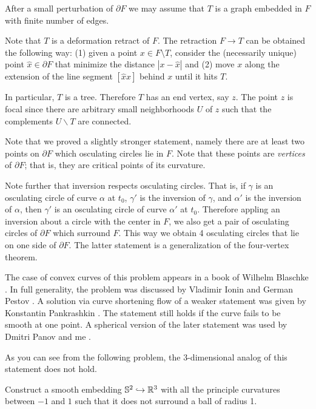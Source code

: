 \medskip

After a small perturbation
of $\partial F$ we may assume that
$T$ is a graph embedded in
$F$ with finite number of edges.

Note that $T$ is a
deformation retract of $F$.
The retraction $F\to T$ can be obtained the following way:
(1) given a point $x\in F\setminus T$,
consider the (necessarily unique) point $\hat x\in \partial F$ that minimize the distance $|x-\hat x|$ and
(2) move $x$ along the extension of the line segment $[\hat x x]$ behind $x$ until it hits $T$.

In particular, $T$ is a tree.
Therefore $T$ has
an end vertex, say $z$.
The point $z$ is focal since there are arbitrary small neighborhoods $U$ of $z$ such that the complements $U\backslash T$ are connected.
\qeds

Note that we proved a slightly stronger statement, namely there are at least two points on $\partial F$ which osculating circles lie in $F$.
Note that these points are \emph{vertices} of $\partial F$;
that is, they are critical points of its curvature.

Note further that inversion respects osculating circles.
That is, if $\gamma$ is an osculating circle of curve $\alpha$ at $t_0$,
$\gamma'$ is the inversion of $\gamma$, and 
$\alpha'$ is the inversion of $\alpha$,
then $\gamma'$ is an osculating circle of curve $\alpha'$ at $t_0$.
Therefore appling an inversion about a circle with the center in $F$, we also get a pair of osculating circles of $\partial F$ which surround $F$.
This way we obtain 4 osculating circles that lie on one side of $\partial F$.
The latter statement is a generalization of the four-vertex theorem.

The case of convex curves of this problem appears in a book of Wilhelm Blaschke \cite[see \S 24 in][]{blaschke}.
In full generality, the problem was discussed by Vladimir Ionin and German Pestov \cite{pestov-ionin}. %
A solution via curve shortening flow of a weaker statement 
was given by Konstantin Pankrashkin \cite{pankrashkin}.
The statement still holds if the curve fails to be smooth at one point.
A spherical version of the later statement 
was used by Dmitri Panov and me \cite{panov-petrunin-ramification}.

As you can see from the following problem, the 3-dimensional analog of this statement does not hold.

\begin{pr}
Construct a smooth embedding $\mathbb{S}^2\hookrightarrow \mathbb{R}^3$ 
with all the principle curvatures between $-1$ and $1$
such that it does not surround a ball of radius 1.
\end{pr}


